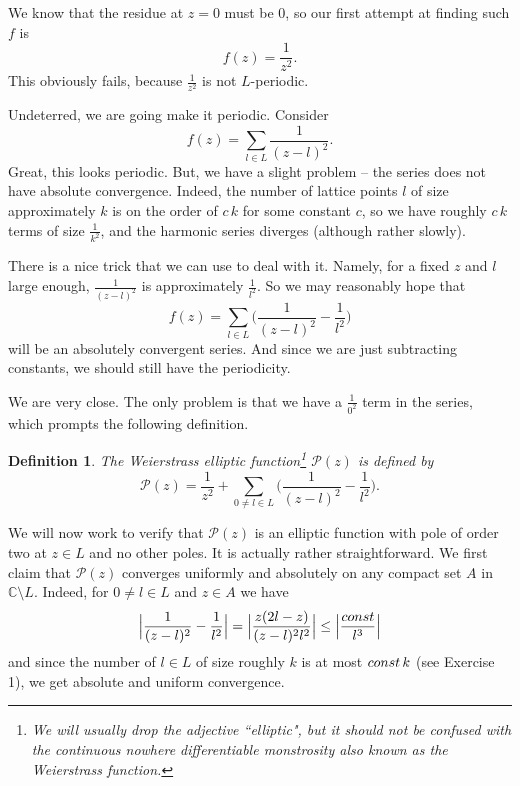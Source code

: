 \documentclass[11pt]{article}
\numberwithin{equation}{section}
\numberwithin{footnote}{section}
\newtheorem{defn}[thm]{Definition}
\newcommand{\C}{{\mathbb C}}
\begin{document}
\smallskip
We know that the residue at $z=0$ must be $0$, so our first attempt at finding such $f$ is 
$$
f(z) = \frac 1{z^2}.
$$
This obviously fails, because $\frac 1{z^2}$ is not $L$-periodic.

\smallskip
Undeterred, we are going make it periodic. Consider
$$
f(z) = \sum_{l\in L} \frac 1{(z-l)^2}.
$$
Great, this looks periodic. But, we have a slight problem -- the series does not have absolute convergence. Indeed, the number of lattice points $l$ of size approximately $k$ is on the order of $c\, k$ for some constant $c$, so we have roughly $c\, k$ terms of size $\frac 1{k^2}$, and the harmonic series diverges (although rather slowly).

\smallskip
There is a nice trick that we can use to deal with it. Namely, for a fixed $z$ and  $l$ large enough, $\frac 1{(z-l)^2}$ is approximately $\frac 1{l^2}$. So we may reasonably hope that 
\begin{equation}\label{almostW}
f(z) = \sum_{l\in L} \Big(\frac 1{(z-l)^2}-\frac 1{l^2}\Big)
\end{equation}
will be an absolutely convergent series. And since we are just subtracting constants, we should still have the periodicity.

\smallskip
We are very close. The only problem is that we have a $\frac 1{0^2}$ term in the series, which prompts the following definition.

\smallskip
\begin{defn}The Weierstrass elliptic function\footnote{ We will usually drop the adjective ``elliptic", but it should not be confused with the continuous nowhere differentiable monstrosity also known as the Weierstrass function.} $\mathcal P(z)$ is defined by
\begin{equation}\label{Weier}
\mathcal P(z) = \frac 1{z^2} + \sum_{0\neq l\in L} \Big(\frac 1{(z-l)^2}-\frac 1{l^2}\Big).
\end{equation}
\end{defn}

\smallskip
We will now work to verify that $\mathcal P(z)$ is an elliptic function with pole of order two at $z\in L$ and no other poles. It is actually rather straightforward. We first claim that $\mathcal P(z)$ converges uniformly and absolutely on any compact set $A$ in $\C\setminus L$. Indeed, for $0\neq l\in L$  and $z\in A$ we have
$$
\Big\vert
\frac 1{(z-l)^2}-\frac 1{l^2} 
\Big\vert=
\Big\vert
\frac {z(2l-z)}{(z-l)^2l^2}  \Big\vert \leq  \Big\vert \frac {\rm const} {l^3}\Big\vert
$$ 
and since the number of $l\in L$ of size roughly $k$ is at most ${\rm const}\,k$ (see Exercise 1), we get absolute and uniform convergence. 
\end{document}
